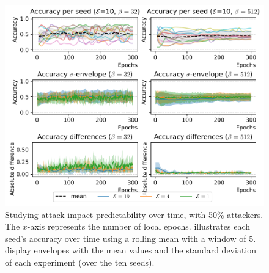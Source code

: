 \begin{figure}
  \centering
  \includegraphics[width=\textwidth]{figures/cicids/predictability-all}
  \caption{
    Studying attack impact predictability over time, with 50\% attackers.
    The $x$-axis represents the number of local epochs.
     illustrates each seed's accuracy over time using a rolling mean with a window of 5. 
     display envelopes with the mean values and the standard deviation of each experiment (over the ten seeds).
  }
  \label{fig:predictability}
\end{figure}